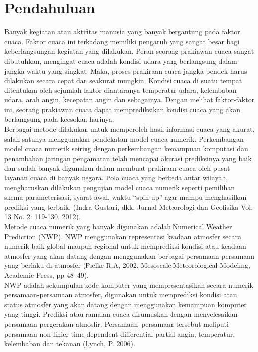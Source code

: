 \documentclass[journal]{IEEEtran}
\begin{document}
\section{Pendahuluan}
\hspace*{0.7cm}Banyak kegiatan atau aktifitas manusia yang banyak bergantung pada faktor cuaca. Faktor cuaca ini terkadang memiliki pengaruh yang sangat besar bagi keberlangsungan kegiatan yang dilakukan. Peran seorang prakiawan cuaca sangat dibutuhkan, mengingat cuaca adalah kondisi udara yang berlangsung dalam jangka waktu yang singkat. Maka, proses prakiraan cuaca jangka pendek harus dilakukan secara cepat dan seakurat mungkin. Kondisi cuaca di suatu tempat ditentukan oleh sejumlah faktor diantaranya temperatur udara, kelembaban udara, arah angin, kecepatan angin dan sebagainya. Dengan melihat faktor-faktor ini, seorang prakiawan cuaca dapat memprediksikan kondisi cuaca yang akan berlangsung pada keesokan harinya.\\
\hspace*{1cm}Berbagai metode dilakukan untuk memperoleh hasil informasi cuaca yang akurat, salah satunya menggunakan pendekatan model cuaca numerik. Perkembangan model cuaca numerik seiring dengan perkembangan kemampuan komputasi dan penambahan jaringan pengamatan telah mencapai akurasi prediksinya yang baik dan sudah banyak digunakan dalam membuat prakiraan cuaca oleh pusat layanan cuaca di banyak negara. Pola cuaca yang berbeda antar wilayah, mengharuskan dilakukan pengujian model cuaca numerik seperti pemilihan skema parameterisasi, syarat awal, waktu “spin-up” agar mampu menghasilkan prediksi yang terbaik. (Indra Gustari, dkk. Jurnal Meteorologi dan Geofisika Vol. 13 No. 2: 119-130. 2012).\\
\hspace*{1cm}Metode cuaca numerik yang banyak digunakan adalah Numerical Weather Prediction (NWP). NWP menggunakan representasi keadaan atmosfer secara numerik baik global maupun regional untuk memprediksi kondisi atau keadaan atmosfer yang akan datang dengan menggunakan berbagai persamaan-persamaan yang berlaku di atmosfer (Pielke R.A, 2002, Mesoscale Meteorological Modeling, Academic Press, pp 48–49).\\
\hspace*{1cm}NWP adalah sekumpulan kode komputer yang mempresentasikan secara numerik persamaan-persamaan atmosfer, digunakan untuk memprediksi kondisi atau status atmosfer yang akan datang dengan menggunakan kemampuan komputer yang tinggi. Prediksi atau ramalan cuaca dirumuskan dengan menyelesaikan persamaan pergerakan atmosfir. Persamaan–persamaan tersebut meliputi persamaan non-linier time-dependent differential partial angin, temperatur, kelembaban dan tekanan (Lynch, P. 2006).\\
\end{document}
